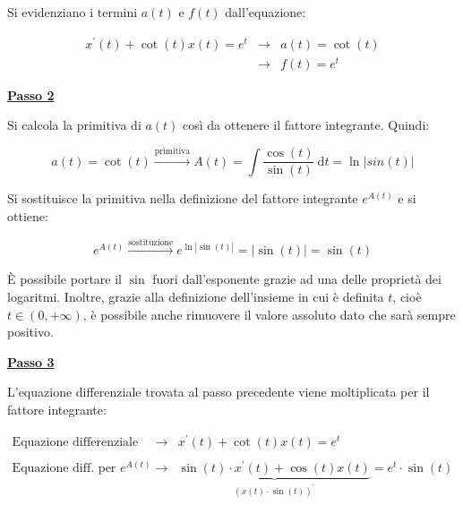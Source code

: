 \documentclass[a4paper]{article}
\begin{document}
	\noindent
	Si evidenziano i termini $a\left(t\right)$ e $f\left(t\right)$ dall'equazione:
	
	\begin{equation*}
		\begin{array}{lll}
			x^{'}\left(t\right) + \cot \left(t\right) x\left(t\right) = e^{t}	& \longrightarrow & a\left(t\right) = \cot\left(t\right) \\
			& \longrightarrow & f\left(t\right) = e^{t}
		\end{array}
	\end{equation*}

	\noindent
	\textcolor{Red3}{\textbf{\underline{Passo 2}}}\newline
	
	\noindent
	Si calcola la primitiva di $a\left(t\right)$ così da ottenere il fattore integrante. Quindi:
	
	\begin{equation*}
		a\left(t\right) = \cot\left(t\right) \xrightarrow{\text{primitiva}} A\left(t\right) = \int\dfrac{\cos\left(t\right)}{\sin\left(t\right)} \: \mathrm{d}t = \ln \left|sin\left(t\right)\right|
	\end{equation*}
	
	\noindent
	Si sostituisce la primitiva nella definizione del fattore integrante $e^{A\left(t\right)}$ e si ottiene:
	
	\begin{equation*}
		e^{A\left(t\right)} \xrightarrow{\text{sostituzione}} e^{\ln\left|\sin\left(t\right)\right|} = \left|\sin\left(t\right)\right| = \sin\left(t\right)
	\end{equation*}
	
	\noindent
	È possibile portare il $\sin$ fuori dall'esponente grazie ad una delle proprietà dei logaritmi. Inoltre, grazie alla definizione dell'insieme in cui è definita $t$, cioè $t\in\left(0, +\infty\right)$, è possibile anche rimuovere il valore assoluto dato che sarà sempre positivo.\newline
	
	\noindent
	\textcolor{Red3}{\textbf{\underline{Passo 3}}}\newline
	
	\noindent
	L'equazione differenziale trovata al passo precedente viene moltiplicata per il fattore integrante:
	
	\begin{equation*}
		\begin{array}{lll}
			\text{Equazione differenziale}					& \longrightarrow & x^{'}\left(t\right) + \cot \left(t\right) x\left(t\right) = e^{t} \\
			&& \\
			\text{Equazione diff. per } e^{A\left(t\right)}	& \longrightarrow & \underbrace{\sin\left(t\right) \cdot x^{'}\left(t\right) + \cos\left(t\right) x\left(t\right)}_{\left(x\left(t\right) \cdot \sin\left(t\right)\right)^{'}} = e^{t} \cdot \sin\left(t\right)
		\end{array}
	\end{equation*}
\end{document}
